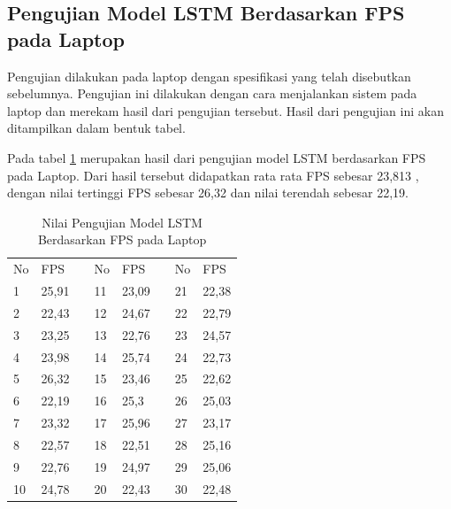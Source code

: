 
\subsection{Pengujian Model LSTM Berdasarkan FPS pada Laptop}

Pengujian dilakukan pada laptop dengan spesifikasi yang telah disebutkan sebelumnya. Pengujian ini dilakukan dengan cara menjalankan sistem pada laptop dan merekam hasil dari pengujian tersebut. Hasil dari pengujian ini akan ditampilkan dalam bentuk tabel.

Pada tabel \ref{tb:TabelLSTMLaptop} merupakan hasil dari pengujian model LSTM berdasarkan FPS pada Laptop. Dari hasil tersebut didapatkan rata rata FPS sebesar 23,813 , dengan nilai tertinggi FPS sebesar 26,32 dan nilai terendah sebesar 22,19.


\begin{table}[H]
  \centering
  \caption{Nilai Pengujian Model LSTM Berdasarkan FPS pada Laptop} 
  \label{tb:TabelLSTMLaptop}
  \begin{tabular}{|l|l|l|l|l|l|l|l|}
  \cline{1-2} \cline{4-5} \cline{7-8}
  No & FPS   &  & No & FPS   &  & No & FPS   \\ \cline{1-2} \cline{4-5} \cline{7-8} 
  1  & 25,91 &  & 11 & 23,09 &  & 21 & 22,38 \\ \cline{1-2} \cline{4-5} \cline{7-8} 
  2  & 22,43 &  & 12 & 24,67 &  & 22 & 22,79 \\ \cline{1-2} \cline{4-5} \cline{7-8} 
  3  & 23,25 &  & 13 & 22,76 &  & 23 & 24,57 \\ \cline{1-2} \cline{4-5} \cline{7-8} 
  4  & 23,98 &  & 14 & 25,74 &  & 24 & 22,73 \\ \cline{1-2} \cline{4-5} \cline{7-8} 
  5  & 26,32 &  & 15 & 23,46 &  & 25 & 22,62 \\ \cline{1-2} \cline{4-5} \cline{7-8} 
  6  & 22,19 &  & 16 & 25,3  &  & 26 & 25,03 \\ \cline{1-2} \cline{4-5} \cline{7-8} 
  7  & 23,32 &  & 17 & 25,96 &  & 27 & 23,17 \\ \cline{1-2} \cline{4-5} \cline{7-8} 
  8  & 22,57 &  & 18 & 22,51 &  & 28 & 25,16 \\ \cline{1-2} \cline{4-5} \cline{7-8} 
  9  & 22,76 &  & 19 & 24,97 &  & 29 & 25,06 \\ \cline{1-2} \cline{4-5} \cline{7-8} 
  10 & 24,78 &  & 20 & 22,43 &  & 30 & 22,48 \\ \cline{1-2} \cline{4-5} \cline{7-8} 
  \end{tabular}
\end{table}

